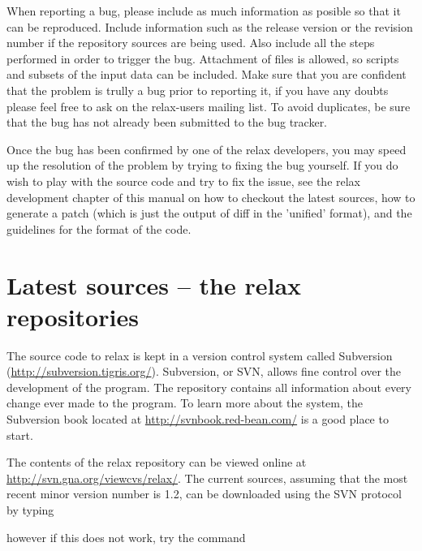 When reporting a bug, please include as much information as posible so that it can be reproduced.  Include information such as the release version or the revision number if the repository sources are being used.  Also include all the steps performed in order to trigger the bug.  Attachment of files is allowed, so scripts and subsets of the input data can be included.  Make sure that you are confident that the problem is trully a bug prior to reporting it, if you have any doubts please feel free to ask on the relax-users mailing list.  To avoid duplicates, be sure that the bug has not already been submitted to the bug tracker.

Once the bug has been confirmed by one of the relax developers, you may speed up the resolution of the problem by trying to fixing the bug yourself.  If you do wish to play with the source code and try to fix the issue, see the relax development chapter of this manual on how to checkout the latest sources, how to generate a patch (which is just the output of diff in the 'unified' format), and the guidelines for the format of the code.




\section{Latest sources -- the relax repositories}

The source code to relax is kept in a version control system called Subversion (\href{http://subversion.tigris.org/}{http://subversion.tigris.org/}).  Subversion, or SVN, allows fine control over the development of the program.  The repository contains all information about every change ever made to the program.  To learn more about the system, the Subversion book located at \href{http://svnbook.red-bean.com/}{http://svnbook.red-bean.com/} is a good place to start.

The contents of the relax repository can be viewed online at \href{http://svn.gna.org/viewcvs/relax/}{http://svn.gna.org/viewcvs/relax/}.  The current sources, assuming that the most recent minor version number is 1.2, can be downloaded using the SVN protocol by typing


however if this does not work, try the command


